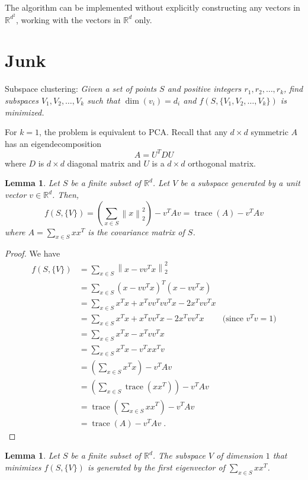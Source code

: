\documentclass[12pt]{article}
\newtheorem{lemma}[theorem]{Lemma}
\newcommand{\R}{\mathbb{R}}
\newcommand{\norm}[1]{\left\|#1\right\|}
\DeclareMathOperator*{\trace}{trace}
\begin{document}
The algorithm can be implemented without explicitly constructing
any vectors in $\R^{d^2}$, working with the vectors in $\R^d$ only.

\section{Junk}

Subspace clustering: \emph{Given a set of points $S$ and positive integers
$r_1, r_2, \dots, r_k$, find subspaces $V_1, V_2, \dots, V_k$ such that
$\dim(v_i) = d_i$ and $f(S, \{V_1, V_2, \dots, V_k\})$ is minimized.}

For $k=1$, the problem is equivalent to PCA. Recall that any $d \times d$
symmetric $A$ has an eigendecomposition
$$
A = U^T D U
$$
where $D$ is $d \times d$ diagonal matrix and $U$ is a $d \times d$
orthogonal matrix.

\begin{lemma}
Let $S$ be a finite subset of $\R^d$. Let $V$ be a subspace
generated by a unit vector $v \in \R^d$. Then,
$$
f(S,\{V\})
= \left(\sum_{x \in S} \norm{x}_2^2 \right) - v^T A v
= \trace(A) - v^T A v
$$
where $A = \sum_{x \in S} xx^T$ is the covariance matrix of $S$.
\end{lemma}

\begin{proof}
We have
\begin{align*}
f(S, \{V\})
& = \sum_{x \in S} \norm{x - vv^T x}_2^2 \\
& = \sum_{x \in S} (x - vv^T x)^T (x - vv^Tx) \\
& = \sum_{x \in S} x^Tx + x^T vv^T vv^T x - 2 x^T vv^T x  \\
& = \sum_{x \in S} x^Tx + x^T vv^T x - 2 x^T vv^T x & \text{(since $v^Tv = 1$)} \\
& = \sum_{x \in S} x^Tx - x^T vv^T x  \\
& = \sum_{x \in S} x^Tx - v^T xx^T v  \\
& = \left(\sum_{x \in S} x^Tx \right) - v^T A v  \\
& = \left(\sum_{x \in S} \trace(xx^T) \right) - v^T A v \\
& = \trace \left(\sum_{x \in S} xx^T \right) - v^T A v \\
& = \trace(A) - v^T A v \; .
\end{align*}
\end{proof}

\begin{lemma}
Let $S$ be a finite subset of $\R^d$.
The subspace $V$ of dimension $1$ that minimizes $f(S, \{V\})$ is generated
by the first eigenvector of $\sum_{x \in S} xx^T$.
\end{lemma}
\end{document}
